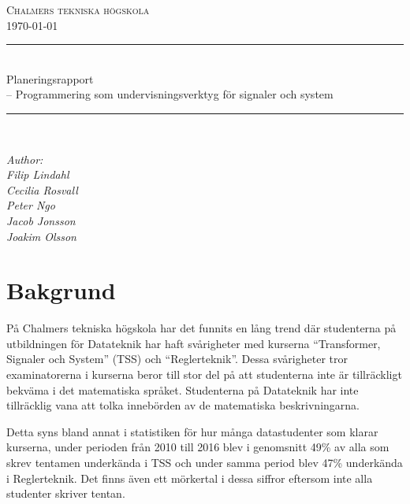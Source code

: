 \documentclass{article}
\begin{document}
\begin{titlepage} \newcommand{\HRule}{\rule{\linewidth}{0.3mm}}
\center
\textsc{\Large Chalmers tekniska högskola}\\[0.05cm] %
\normalsize \today

\HRule \\[0.08cm]
{ \large Planeringsrapport \\ \normalsize{-- Programmering som undervisningsverktyg för signaler och system}}\\[0.08cm] %
\HRule \\[0.3cm]

\vfill

\begin{flushleft} \small
    \emph{Author: \\
    \quad Filip Lindahl\\
    \quad Cecilia Rosvall\\
    \quad Peter Ngo\\
    \quad Jacob Jonsson\\
    \quad Joakim Olsson\\}
\end{flushleft}
\end{titlepage}
\newpage

\section{Bakgrund}
På Chalmers tekniska högskola har det funnits en lång trend där
studenterna på utbildningen för Datateknik har haft svårigheter med
kurserna ``Transformer, Signaler och System'' (TSS) och
“Reglerteknik”. Dessa svårigheter tror examinatorerna i kurserna beror
till stor del på att studenterna inte är tillräckligt bekväma i det
matematiska språket. Studenterna på Datateknik har inte tillräcklig
vana att tolka innebörden av de matematiska beskrivningarna.

Detta syns bland annat i statistiken för hur många
datastudenter som klarar kurserna, under perioden från
2010 till 2016 blev i genomsnitt 49\% av alla som skrev
tentamen underkända i TSS och under samma period blev
47\% underkända i Reglerteknik.
Det finns även ett mörkertal i dessa siffror eftersom inte alla studenter skriver tentan.
\end{document}
